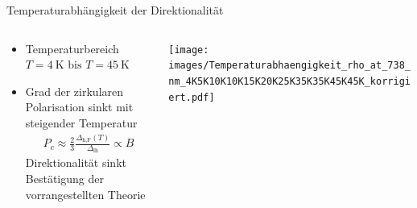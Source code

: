 \begin{frame}{Temperaturabhängigkeit der Direktionalität}
    \begin{columns}
        \begin{column}{0.5\textwidth}
            \begin{itemize}
                \item <1-> Temperaturbereich $T = \SI{4}{\kelvin}\text{ bis }T = \SI{45}{\kelvin}$
                \bigskip
                \item <2-> Grad der zirkularen Polarisation sinkt mit steigender Temperatur
                \begin{align*}
                    P_c \approx \frac{2}{3} \frac{\Delta_\text{h,F}(T)}{\Delta_\text{lh}} \propto B
                \end{align*}
                \rightarrow Direktionalität sinkt                
                \rightarrow Bestätigung der vorrangestellten Theorie
            \end{itemize}
        \end{column}
        \begin{column}{0.5\textwidth}
            \centering 
             {%
            \texttt{[image: images/Temperaturabhaengigkeit\_rho\_at\_738\_nm\_4K5K10K10K15K20K25K35K35K45K45K\_korrigiert.pdf]}\\[-0.5\baselineskip]%
            }%
        \end{column}
    \end{columns}
\end{frame}

